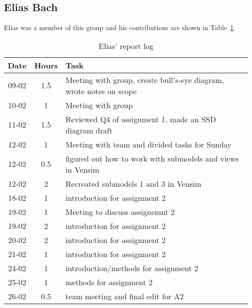 
\subsection{Elias Bach}
Elias was a member of this group and his contributions are shown in Table~\ref{tab:elias_log}. 
\begin{longtable}[c]{c|c|m{35em}}
\caption{Elias' report log}
\label{tab:elias_log}\\
\textbf{Date}& \textbf{Hours} & \textbf{Task} \\
\hline
\endfirsthead
%
\endhead
%
09-02 & 1.5 & Meeting with group, create bull's-eye diagram, wrote notes on scope\\
10-02 & 1 & Meeting with group \\
11-02 & 1.5 & Reviewed Q4 of assignment 1, made an SSD diagram draft \\
12-02 & 1 & Meeting with team and divided tasks for Sunday\\ 
12-02 & 0.5 & figured out how to work with submodels and views in Vensim \\
12-02 & 2 & Recreated submodels 1 and 3 in Vensim \\
18-02 & 1 & introduction for assignment 2 \\
19-02 & 1 & Meeting to discuss assignemnt 2\\
19-02 & 2 & introduction for assignment 2 \\
20-02 & 2 & introduction for assignment 2 \\
21-02 & 1 & introduction for assignment 2 \\
24-02 & 1 & introduction/methods for assignment 2 \\
25-02 & 1 & methods for assignment 2 \\
26-02 & 0.5 & team meeting and final edit for A2 \\

\end{longtable}

